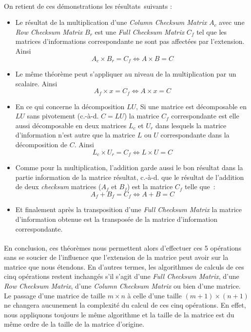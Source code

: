 \documentclass[a4paper,10pt]{report}
\begin{document}
\paragraph*{}
On retient de ces démonstrations les résultats suivants :
\begin{itemize}
 \item Le résultat de la multiplication d’une \textit{Column Checksum Matrix} $A_c$ avec une \textit{Row Checksum Matrix}
       $B_r$ est une \textit{Full Checksum Matrix} $C_f$ tel que les matrices d’informations correspondante ne sont pas 
       affectées par l’extension. Ainsi \[ A_c \times B_r = C_f \Leftrightarrow A \times B = C \]
 \item Le même théorème peut s’appliquer au niveau de la multiplication par un scalaire. Ainsi
       \[ A_f \times x = C_f \Leftrightarrow A \times x = C \]
 \item En ce qui concerne la décomposition $LU$, Si une matrice est décomposable en $LU$ sans pivotement 
       (c.-à-d. $C = LU$) la matrice $C_f$ correspondante est elle aussi décomposable en deux matrices $L_c$ 
       et $U_r$ dans lesquels la matrice d’information n’est autre que la matrice $L$ ou $U$ correspondante 
       dans la décomposition de $C$.
       Ainsi \[ L_c \times U_r = C_f \Leftrightarrow L \times U = C \]
\item Comme pour la multiplication, l’addition garde aussi le bon résultat dans la partie information de la 
      matrice résultat, c.-à-d. que le résultat de l’addition de deux \textit{checksum} matrices ($A_f$ et $B_f$) 
      est la matrice $C_f$ telle que :
      \[ A_f + B_f = C_f \Leftrightarrow A + B = C \]
\item Et finalement après la transposition d’une \textit{Full Checksum Matrix} la matrice d’information obtenue 
      est la transposée de la matrice d’information correspondante.
\end{itemize}
\paragraph*{}
En conclusion, ces théorèmes nous permettent alors d’effectuer ces 5 opérations sans se soucier de l’influence 
que l’extension de la matrice peut avoir sur la matrice que nous étendons. En d’autres termes,  les algorithmes 
de calculs de ces cinq opérations restent inchangés s’il s’agit d’une \textit{Full Checksum Matrix}, d’une 
\textit{Row Checksum Matrix}, d’une \textit{Column Checksum Matrix} ou bien d’une matrice.\newline
Le passage d’une matrice de taille $m \times n$ à celle d’une taille $(m+1) \times (n+1)$ ne changera aucunement 
la complexité du calcul de ces cinq opérations. En effet, nous appliquons toujours le même algorithme et la taille 
de la matrice est du même ordre de la taille de la matrice d’origine.
\end{document}
